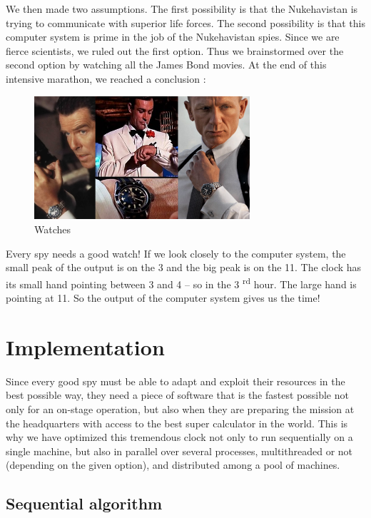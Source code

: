 \documentclass[11pt,a4paper]{article}
\begin{document}
We then made two assumptions. The first possibility is that the Nukehavistan is trying to communicate with superior life forces. The second possibility is that this computer system is prime in the job of the Nukehavistan spies. Since we are fierce scientists, we ruled out the first option. Thus we brainstormed over the second option by watching all the James Bond movies. At the end of this intensive marathon, we reached a conclusion :

\begin{figure}[!h]
\centering
\includegraphics[width=8cm]{watches.png}
\caption{Watches}
\label{reverse}
\end{figure}

Every spy needs a good watch! If we look closely to the computer system, the small peak of the output is on the 3 and the big peak is on the 11. The clock has its small hand pointing between 3 and 4 -- so in the 3 \textsuperscript{rd} hour. The large hand is pointing at 11. So the output of the computer system gives us the time!

\section{Implementation}

Since every good spy must be able to adapt and exploit their resources in the best possible way, they need a piece of software that is the fastest possible not only for an on-stage operation, but also when they are preparing the mission at the headquarters with access to the best super calculator in the world. This is why we have optimized this tremendous clock not only to run sequentially on a single machine, but also in parallel over several processes, multithreaded or not (depending on the given option), and distributed among a pool of machines.

\subsection{Sequential algorithm}
\end{document}
